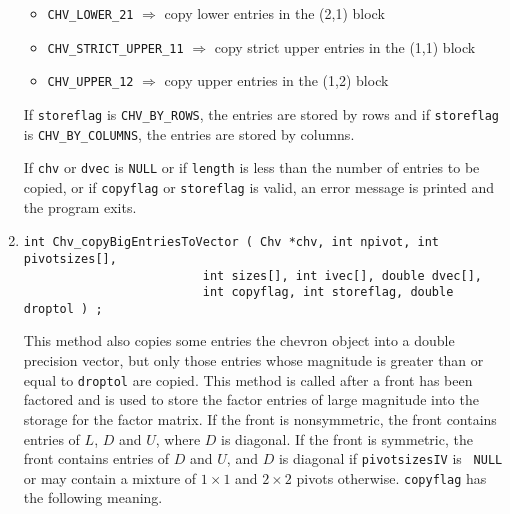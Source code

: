 \begin{enumerate}
\begin{itemize}
\item {\tt CHV\_LOWER\_21} $\Longrightarrow$ 
              copy lower entries in the (2,1) block
\item {\tt CHV\_STRICT\_UPPER\_11} $\Longrightarrow$ 
              copy strict upper entries in the (1,1) block
\item {\tt CHV\_UPPER\_12} $\Longrightarrow$ 
              copy upper entries in the (1,2) block
\end{itemize}
\par
If {\tt storeflag} is {\tt CHV\_BY\_ROWS}, 
the entries are stored by rows
and if {\tt storeflag} is {\tt CHV\_BY\_COLUMNS}, 
the entries are stored by columns.
\par {}
If {\tt chv} or {\tt dvec} is {\tt NULL}
or if {\tt length} is less than the number of entries to be copied,
or if {\tt copyflag} or {\tt storeflag} is valid,
an error message is printed and the program exits.
\item
\begin{verbatim}
int Chv_copyBigEntriesToVector ( Chv *chv, int npivot, int pivotsizes[],
                         int sizes[], int ivec[], double dvec[], 
                         int copyflag, int storeflag, double droptol ) ;
\end{verbatim}
This method also copies some entries the chevron object into a double
precision vector, but only those entries whose magnitude is
greater than or equal to {\tt droptol} are copied.
This method is called after a front has been factored and 
is used to store the factor entries of large magnitude into the
storage for the factor matrix.
If the front is nonsymmetric, the front contains entries
of $L$, $D$ and $U$, where $D$ is diagonal.
If the front is symmetric, the front contains entries
of $D$ and $U$, and $D$ is diagonal if {\tt pivotsizesIV} is {\tt
NULL} or may contain a mixture of $1 \times 1$ and $2 \times 2$
pivots otherwise.
{\tt copyflag} has the following meaning.
\begin{itemize}

\end{itemize}
\end{enumerate}
